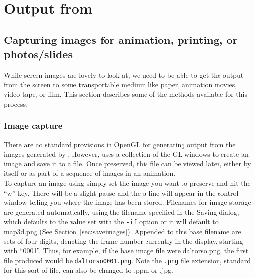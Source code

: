 \section{Output from \map{}}

\subsection{Capturing images for animation, printing, or photos/slides}
\label{sec:output} 

While screen images are lovely to look at, we need to be able to get the
output from the screen to some transportable medium like paper, animation
movies, video tape, or film.  This section describes some of the methods
available for this process.

\subsubsection{Image capture}
\label{sec:capture}
 
There are no standard provisions in OpenGL for generating output from the
images generated by \map{}.  However, \map{} uses a collection of the GL
windows to create an image and save it to a file.  Once preserved,
this file can be viewed later, either by itself or as part of a sequence of
images in an animation. \\

To capture an image using \map{} simply set the image you want to preserve
and hit the ``w''-key. There will be a slight pause and the a line will
appear in the control window telling you where the image has been stored.
Filenames for image storage are generated automatically, using the filename
specified in the Saving dialog, which defaults to the value set with the
{\tt -if} option or it will default to map3d.png (See
Section~\ref{sec:saveimages}).  Appended to this base filename are sets of
four digits, denoting the frame number currently in the display, starting
with ``0001''.  Thus, for example, if the base image file were
daltorso.png, the first file produced would be {\tt daltorso0001.png}.
Note the {\tt .png} file extension, standard for this sort of file, can
also be changed to .ppm or
.jpg. \\

